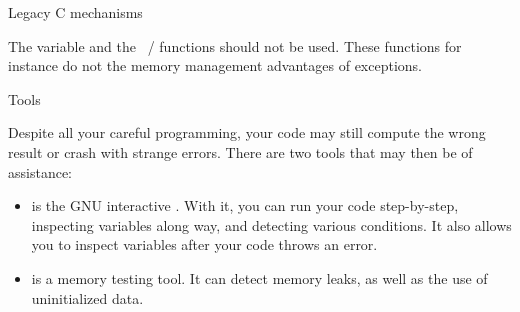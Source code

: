  {Legacy C mechanisms}

The  variable and the
~/  functions should not be
used. These functions for instance do not the memory management
advantages of exceptions.

 {Tools}

Despite all your careful programming, your code may still compute the
wrong result or crash with strange errors. There are two tools that
may then be of assistance:
\begin{itemize}
\item {} is the GNU interactive
  . With it, you can run your code step-by-step,
  inspecting variables along way, and detecting various conditions. It
  also allows you to inspect variables after your code throws an
  error.
\item {} is a memory testing tool. It can detect
  memory leaks, as well as the use of uninitialized data.
\end{itemize}

